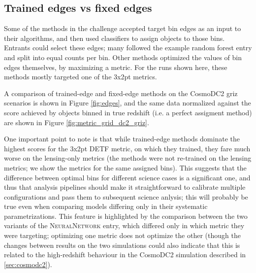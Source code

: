 \documentclass[twocolumn,twocolappendix]{aastex63}
\begin{document}
\subsection{Trained edges vs fixed edges}\label{sec:train-vs-fix}

Some of the methods in the challenge accepted target bin edges as an input to their algorithms,
and then used classifiers to assign objects to those bins.  Entrants could select these edges; many followed the example random forest entry and split into equal counts per bin. Other methods optimized the values
of bin edges themselves, by maximizing a metric.  For the runs shown here, these methods mostly
targeted one of the 3x2pt metrics.

A comparison of trained-edge and fixed-edge methods on the CosmoDC2 griz scenarios
is shown in Figure \ref{fig:edges}, and the same data normalized against the score achieved
by objects binned in true redshift (i.e. a perfect assigment method) are shown in Figure \ref{fig:metric_grid_dc2_griz}.

One important point to note is that while trained-edge
methods dominate the highest scores for the 3x2pt DETF metric, on which they trained, they
fare much worse on the lensing-only metrics (the methods were not re-trained on the lensing metrics;
we show the metrics for the same assigned bins).  This suggests that the difference between
optimal bins for different science cases is a significant one, and thus that analysis pipelines
should make it straightforward to calibrate multiple configurations and pass them to
subsequent science anlysis; this will probably be true even when comparing models
differing only in their systematic parametrizations.  
This feature is highlighted by the comparison between the two variants
of the \textsc{NeuralNetwork} entry, which differed only in which metric they were targeting;
optimizing one metric does not optimize the other (though the changes between results on the two simulations
could also indicate that this is related to the high-redshift behaviour in the CosmoDC2 simulation
described in \ref{sec:cosmodc2}).
\end{document}

